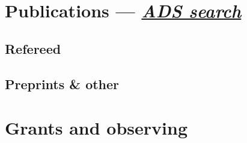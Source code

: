 \documentclass[12pt, letterpaper]{apw-cv}
\begin{document}


\section*{Publications --- \href{\adsurl}{{\it ADS search}}}
\vspace{-1em}


\subsection*{Refereed}
    \begin{itemize}
        
    \end{itemize}

\subsection*{Preprints \& other}
    \begin{itemize}
        
    \end{itemize}

\section*{Grants and observing}
\end{document}
